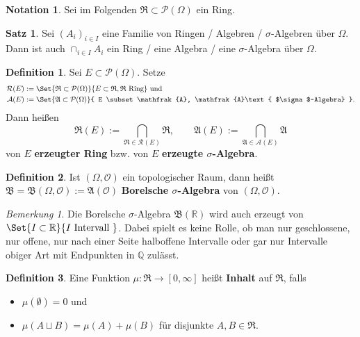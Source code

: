 \documentclass[a4paper,10pt,landscape]{article}
\newcommand{\R}{\mathbb{R}}
\newcommand{\Q}{\mathbb{Q}}
\newcommand{\PS}{\mathcal{P}} %
\newcommand{\PSO}{\PS(\Omega)} %
\newcommand{\Alg}{\mathfrak{A}}
\newcommand{\Ring}{\mathfrak{R}}
\newcommand{\Bor}{\mathfrak{B}} %
\theoremstyle{definition}
\newtheorem*{nota}{Notation}
\newtheorem*{defn}{Definition}
\newtheorem*{satz}{Satz}
\theoremstyle{remark}
\newtheorem*{bem}{Bemerkung}
\renewcommand{\emph}[1]{\textcolor{Emph}{\bf{#1}}}
\begin{document}
\begin{multicols}{3}
\begin{nota}
  Sei im Folgenden $\Ring \subset \PSO$ ein Ring.
\end{nota}


\begin{satz}
  Sei $(A_i)_{i \in I}$ eine Familie von Ringen / Algebren / $\sigma$-Algebren über $\Omega$. Dann ist auch $\cap_{i \in I} A_i$ ein Ring / eine Algebra / eine $\sigma$-Algebra über $\Omega$.
\end{satz}

\begin{defn}
  Sei $E \subset \PSO$. Setze
  \begin{align*}
    \mathcal{R}(E) &:= \Set{ \Ring \subset \PSO }{ E \subset \Ring, \Ring \text{ Ring} } \text{ und} \\
    \mathcal{A}(E) &:= \Set{ \Alg \subset \PSO }{ E \subset \Alg, \Alg \text{ $\sigma$-Algebra} }.
  \end{align*}
  Dann heißen
  \[
    \Ring(E) :=\!\bigcap_{\Ring \in \mathcal{R}(E)}\!\Ring, \qquad
    \Alg(E)  :=\!\bigcap_{\Alg  \in \mathcal{A}(E)}\!\Alg
  \]
  von $E$ \emph{erzeugter Ring} bzw. von $E$ \emph{erzeugte $\sigma$-Algebra}.
\end{defn}

\begin{defn}
  Ist $(\Omega, \mathcal{O})$ ein topologischer Raum, dann heißt $\Bor = \Bor(\Omega, \mathcal{O}) := \Alg(\mathcal{O})$ \emph{Borelsche $\sigma$-Algebra} von $(\Omega, \mathcal{O})$.
\end{defn}

\begin{bem}
  Die Borelsche $\sigma$-Algebra $\Bor(\R)$ wird auch erzeugt von $\Set{I \subset \R }{ I \text{ Intervall } }$. Dabei spielt es keine Rolle, ob man nur geschlossene, nur offene, nur nach einer Seite halboffene Intervalle oder gar nur Intervalle obiger Art mit Endpunkten in $\Q$ zulässt.
\end{bem}

\begin{defn}
  Eine Funktion $\mu : \Ring \to [0, \infty]$ heißt \emph{Inhalt} auf $\Ring$, falls
  \begin{itemize}
    \item $\mu(\emptyset) = 0$ und
    \item $\mu(A \sqcup B) = \mu(A) + \mu(B)$ für disjunkte $A, B \in \Ring$.
  \end{itemize}
\end{defn}


\end{multicols}
\end{document}
